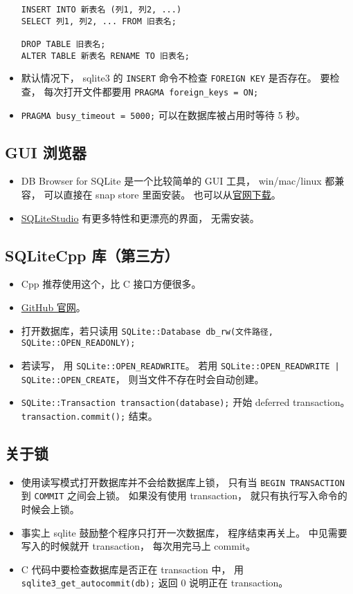 \begin{itemize}
\begin{lstlisting}[language=none]
INSERT INTO 新表名 (列1, 列2, ...)
SELECT 列1, 列2, ... FROM 旧表名;

DROP TABLE 旧表名;
ALTER TABLE 新表名 RENAME TO 旧表名;
\end{lstlisting}
\item 默认情况下， sqlite3 的 \verb`INSERT` 命令不检查 \verb`FOREIGN KEY` 是否存在。 要检查， 每次打开文件都要用 \verb`PRAGMA foreign_keys = ON;`
\item \verb`PRAGMA busy_timeout = 5000;` 可以在数据库被占用时等待 5 秒。
\end{itemize}

\subsection{GUI 浏览器}
\begin{itemize}
\item DB Browser for SQLite 是一个比较简单的 GUI 工具， win/mac/linux 都兼容， 可以直接在 snap store 里面安装。 也可以从\href{https://sqlitebrowser.org/dl/}{官网下载}。
\item \href{https://sqlitestudio.pl/}{SQLiteStudio} 有更多特性和更漂亮的界面， 无需安装。
\end{itemize}

\subsection{SQLiteCpp 库（第三方）}

\begin{itemize}
\item Cpp 推荐使用这个，比 C 接口方便很多。
\item \href{https://github.com/SRombauts/SQLiteCpp}{GitHub 官网}。
\item 打开数据库，若只读用 \verb`SQLite::Database db_rw(文件路径, SQLite::OPEN_READONLY);`
\item 若读写， 用 \verb`SQLite::OPEN_READWRITE`。 若用 \verb`SQLite::OPEN_READWRITE | SQLite::OPEN_CREATE`， 则当文件不存在时会自动创建。
\item \verb`SQLite::Transaction transaction(database);` 开始 deferred transaction。 \verb`transaction.commit();` 结束。
\end{itemize}

\subsection{关于锁}
\begin{itemize}
\item 使用读写模式打开数据库并不会给数据库上锁， 只有当 \verb`BEGIN TRANSACTION` 到 \verb`COMMIT` 之间会上锁。 如果没有使用 transaction， 就只有执行写入命令的时候会上锁。
\item 事实上 sqlite 鼓励整个程序只打开一次数据库， 程序结束再关上。 中见需要写入的时候就开 transaction， 每次用完马上 commit。
\item C 代码中要检查数据库是否正在 transaction 中， 用 \verb`sqlite3_get_autocommit(db);` 返回 0 说明正在 transaction。
\end{itemize}


